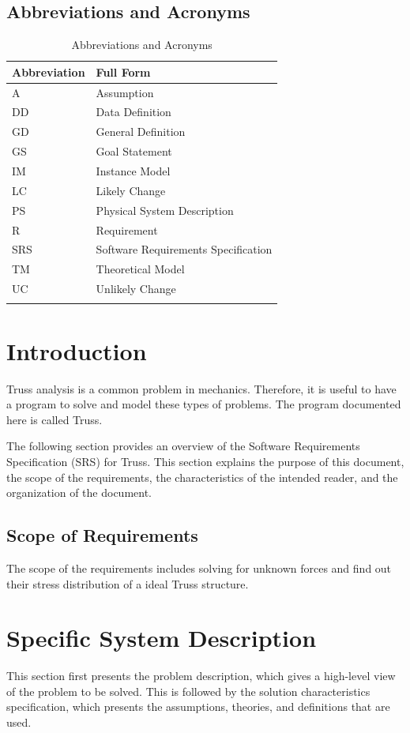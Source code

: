 \documentclass[12pt]{article}
\begin{document}
\subsection{Abbreviations and Acronyms}
\label{Sec:TAbbAcc}
\begin{longtable}{l l}
\toprule
\textbf{Abbreviation} & \textbf{Full Form}
\\
\midrule
\endhead
A & Assumption
\\
DD & Data Definition
\\
GD & General Definition
\\
GS & Goal Statement
\\
IM & Instance Model
\\
LC & Likely Change
\\
PS & Physical System Description
\\
R & Requirement
\\
SRS & Software Requirements Specification
\\
TM & Theoretical Model
\\
UC & Unlikely Change
\\
\bottomrule
\caption{Abbreviations and Acronyms}
\label{Table:TAbbAcc}
\end{longtable}
\section{Introduction}
\label{Sec:Intro}
Truss analysis is a common problem in mechanics. Therefore, it is useful to have a program to solve and model these types of problems. The program documented here is called Truss.

The following section provides an overview of the Software Requirements Specification (SRS) for Truss. This section explains the purpose of this document, the scope of the requirements, the characteristics of the intended reader, and the organization of the document.

\subsection{Scope of Requirements}
\label{Sec:ReqsScope}
The scope of the requirements includes solving for unknown forces and find out their stress distribution of a ideal Truss structure.

\section{Specific System Description}
\label{Sec:SpecSystDesc}
This section first presents the problem description, which gives a high-level view of the problem to be solved. This is followed by the solution characteristics specification, which presents the assumptions, theories, and definitions that are used.
\end{document}
